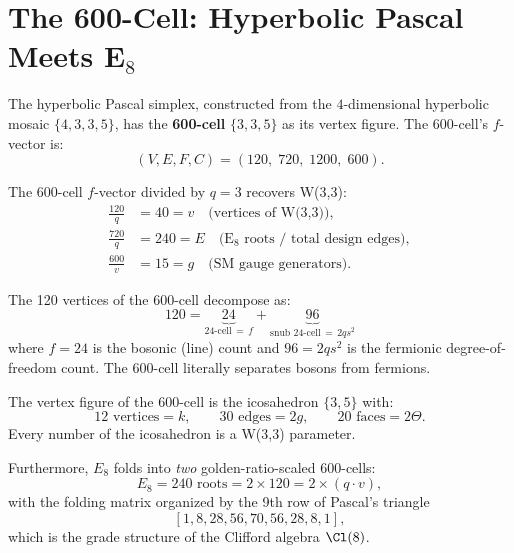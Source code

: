 \section{The 600-Cell: Hyperbolic Pascal Meets E${}_8$}
\label{sec:600cell}

The hyperbolic Pascal simplex, constructed from the $4$-dimensional
hyperbolic mosaic $\{4,3,3,5\}$, has the \textbf{600-cell} $\{3,3,5\}$
as its vertex figure. The 600-cell's $f$-vector is:
\begin{equation}
(V,E,F,C) = (120,\; 720,\; 1200,\; 600).
\end{equation}

\begin{theorem}[600-Cell $=$ W(3,3) $\times\, q$]
\label{thm:600cell}
The 600-cell $f$-vector divided by $q=3$ recovers W(3,3):
\begin{align}
\frac{120}{q} &= 40 = v \quad\text{(vertices of W(3,3))}, \\
\frac{720}{q} &= 240 = E \quad\text{(E${}_8$ roots / total design edges)}, \\
\frac{600}{v} &= 15 = g \quad\text{(SM gauge generators)}.
\end{align}
\end{theorem}

\begin{theorem}
The 120 vertices of the 600-cell decompose as:
\begin{equation}
120 = \underbrace{24}_{\text{24-cell}\,=\,f} + \underbrace{96}_{\text{snub 24-cell}\,=\,2q s^2}
\end{equation}
where $f=24$ is the bosonic (line) count and $96 = 2qs^2$ is the
fermionic degree-of-freedom count. The 600-cell literally
separates bosons from fermions.
\end{theorem}

\begin{corollary}[Icosahedron $=$ W(3,3) Vertex Figure]
The vertex figure of the 600-cell is the icosahedron $\{3,5\}$ with:
\begin{equation}
12\text{ vertices} = k,\qquad 30\text{ edges} = 2g,\qquad 20\text{ faces} = 2\Theta.
\end{equation}
Every number of the icosahedron is a W(3,3) parameter.
\end{corollary}

Furthermore, $E_8$ folds into \emph{two} golden-ratio-scaled 600-cells:
\begin{equation}
E_8 = 240\text{ roots} = 2\times 120 = 2\times(q\cdot v),
\end{equation}
with the folding matrix organized by the 9th row of Pascal's triangle
\[
[1,8,28,56,70,56,28,8,1],
\]
which is the grade structure of the Clifford algebra $\Cl(8)$.


